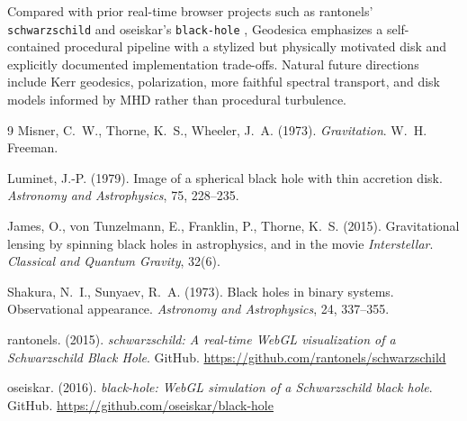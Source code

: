 \documentclass[12pt]{article}
\begin{document}
Compared with prior real-time browser projects such as rantonels' \texttt{schwarzschild} \cite{rantonels} and oseiskar's \texttt{black-hole} \cite{oseiskar}, Geodesica emphasizes a self-contained procedural pipeline with a stylized but physically motivated disk and explicitly documented implementation trade-offs. Natural future directions include Kerr geodesics, polarization, more faithful spectral transport, and disk models informed by MHD rather than procedural turbulence.

\begin{thebibliography}{9}
Misner, C.~W., Thorne, K.~S., Wheeler, J.~A. (1973).
\textit{Gravitation}.
W.~H. Freeman.

Luminet, J.-P. (1979).
Image of a spherical black hole with thin accretion disk.
\textit{Astronomy and Astrophysics}, 75, 228--235.

James, O., von Tunzelmann, E., Franklin, P., Thorne, K.~S. (2015).
Gravitational lensing by spinning black holes in astrophysics, and in the movie \textit{Interstellar}.
\textit{Classical and Quantum Gravity}, 32(6).

Shakura, N.~I., Sunyaev, R.~A. (1973).
Black holes in binary systems. Observational appearance.
\textit{Astronomy and Astrophysics}, 24, 337--355.

rantonels. (2015).
\textit{schwarzschild: A real-time WebGL visualization of a Schwarzschild Black Hole}.
GitHub. \url{https://github.com/rantonels/schwarzschild}

oseiskar. (2016).
\textit{black-hole: WebGL simulation of a Schwarzschild black hole}.
GitHub. \url{https://github.com/oseiskar/black-hole}
\end{thebibliography}
\end{document}
